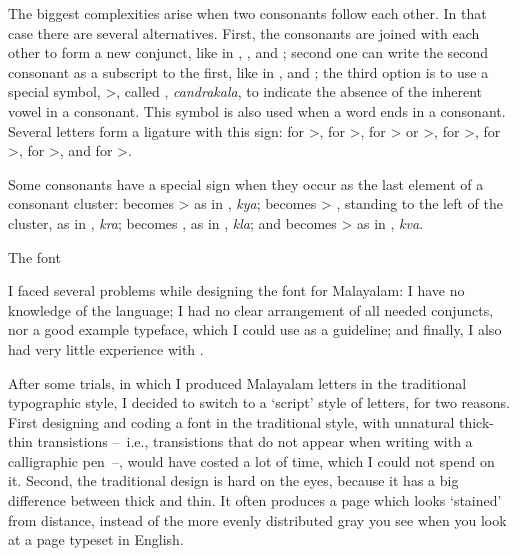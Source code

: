 \noindent The biggest complexities arise when two consonants follow 
each other. In that case there are several alternatives. First, the 
consonants are joined with each other to form a new conjunct, like in 
{\mm {}}, {\mm {}}, and {\mm {}}; second one can write the second consonant as 
a subscript to the first, like in {\mm {}}, and {\mm {}}; the third option 
is to use a special symbol, {\mm {}>}, called {\mm {}}, 
{\it{\mmtr candrakala}}, to indicate the absence of the inherent vowel in 
a consonant. This symbol is also used when a word ends in a consonant. 
Several letters form a ligature with this sign: {\mm {}} for {\mm {}>}, {\mm {}} for 
{\mm {}>}, {\mm {}} for {\mm {}>} or {\mm {}>}, {\mm {}} for {\mm {}>}, {\mm {}} for {\mm {}>}, {\mm {}} for 
{\mm {}>}, and {\mm {}} for {\mm {}>}.

Some consonants have a special sign when they occur as the last 
element of a consonant cluster:
{\mm {}} becomes {\mm {}\hbox{}>} as in {\mm {}}, {\it{\mmtr kya}};
{\mm {}} becomes {\mm {}>\hbox{}} , standing to the left of the cluster, as in
{\mm {}}, {\it{\mmtr kra}};
{\mm {}} becomes {\mm {}}, as in {\mm {}}, {\it{\mmtr kla}}; and
{\mm {}} becomes {\mm {}\hbox{}>} as in {\mm {}}, {\it{\mmtr kva}}.

\beginsection The font

I faced several problems while designing the font for Malayalam: I 
have no knowledge of the language; I had no clear arrangement of all 
needed conjuncts, nor a good example typeface, which I could use as a 
guideline; and finally, I also had very little experience with \MF.

After some trials, in which I produced Malayalam letters in the 
traditional typographic style, I decided to switch to a `script' style 
of letters, for two reasons. First designing and coding a font in the 
traditional style, with unnatural thick-thin transistions --~i.e., 
transistions that do not appear when writing with a calligraphic
pen~--, would have costed a lot of time, which I could not spend on 
it. Second, the traditional design is hard on the eyes, because it has 
a big difference between thick and thin. It often produces a page 
which looks `stained' from distance, instead of the more evenly 
distributed gray you see when you look at a page typeset in English.

